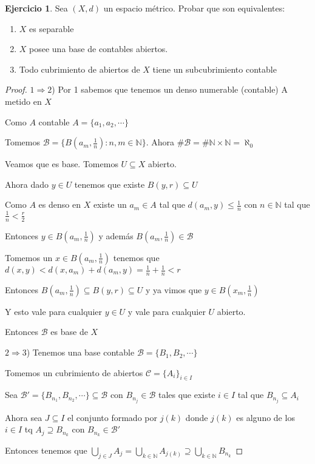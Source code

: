 \documentclass[11pt]{report}
\newcommand{\n}{\aleph_{0}}
\newcommand{\N}{\mathbb{N}}
\newcommand{\Ra}{\Rightarrow}
\theoremstyle{definition}
\newtheorem{ej}{Ejercicio}
\begin{document}
\begin{ej}
	Sea $(X,d)$ un espacio métrico. Probar que son equivalentes:
	\begin{enumerate}
	\item $X$ es separable		
	\item $X$ posee una base de contables abiertos.
	\item Todo cubrimiento de abiertos de $X$ tiene un subcubrimiento contable
	\end{enumerate}

	\begin{proof}
		$1 \Ra 2$) Por 1 sabemos que tenemos un denso numerable (contable) A metido en $X$

		Como $A$ contable $A = \{a_1,a_2,\cdots\}$

		Tomemos $\mathcal{B} = \{B(a_m,\frac{1}{n}) : n,m \in \N\}$. Ahora $\# \mathcal{B} = \# \N\times \N = \n$

		Veamos que es base. Tomemos $U \subseteq X$ abierto. 

		Ahora dado $y \in U$ tenemos que existe $B(y,r) \subseteq U$

		Como $A$ es denso en $X$ existe un $a_m \in A$ tal que $d(a_m,y) \leq \frac{1}{n}$ con $n \in \N$ tal que $\frac{1}{n} < \frac{r}{2}$

		Entonces $y \in B(a_m,\frac{1}{n})$ y además $B(a_m,\frac{1}{n}) \in \mathcal{B}$ 

		Tomemos un $x \in B(a_m,\frac{1}{n})$ tenemos que $d(x,y) < d(x,a_m) + d(a_m,y) = \frac{1}{n} + \frac{1}{n} < r$

		Entonces $B(a_m,\frac{1}{n}) \subseteq B(y,r) \subseteq U$ y ya vimos que $y \in B(x_m,\frac{1}{n})$ 

		Y esto vale para cualquier $y \in U$ y vale para cualquier $U$ abierto.

		Entonces $\mathcal{B}$ es base de $X$

		$2 \Ra 3$) Tenemos una base contable $\mathcal{B} = \{B_1,B_2, \cdots\}$ 

		Tomemos un cubrimiento de abiertos $\mathcal{C} = \{A_i\}_{i \in I}$ 

		Sea $\mathcal{B}' = \{B_{n_1}, B_{n_2},\cdots\} \subseteq \mathcal{B} $ con $B_{n_j} \in \mathcal{B} $ tales que existe $ i \in I$ tal que $B_{n_j} \subseteq A_i$

		Ahora sea $J \subseteq I$ el conjunto formado por $j(k)$ donde $j(k)$ es alguno de los $i \in I$ tq $A_j \supseteq B_{n_k}$ con $B_{n_k} \in \mathcal{B}'$

		Entonces tenemos que $\bigcup_{j \in J} A_j = \bigcup_{k\in\N} A_{j(k)} \supseteq \bigcup_{k\in\N} B_{n_k}$


\end{proof}
\end{ej}
\end{document}
